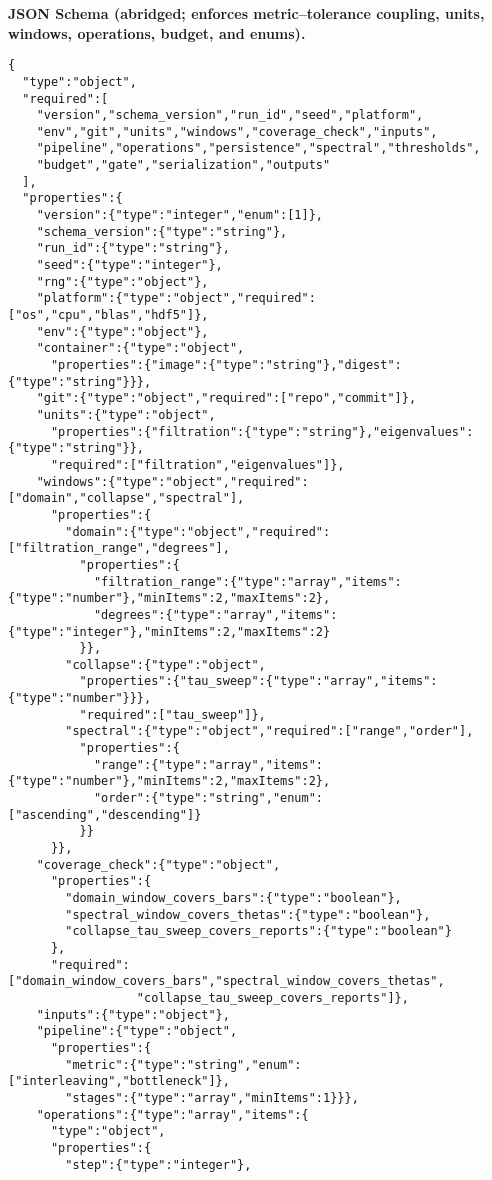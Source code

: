 \documentclass[11pt]{article}
\numberwithin{equation}{section}
\theoremstyle{definition}
\begin{document}
\noindent\textbf{JSON Schema (abridged; enforces metric–tolerance coupling, units, windows, operations, budget, and enums).}
\begin{verbatim}
{
  "type":"object",
  "required":[
    "version","schema_version","run_id","seed","platform",
    "env","git","units","windows","coverage_check","inputs",
    "pipeline","operations","persistence","spectral","thresholds",
    "budget","gate","serialization","outputs"
  ],
  "properties":{
    "version":{"type":"integer","enum":[1]},
    "schema_version":{"type":"string"},
    "run_id":{"type":"string"},
    "seed":{"type":"integer"},
    "rng":{"type":"object"},
    "platform":{"type":"object","required":["os","cpu","blas","hdf5"]},
    "env":{"type":"object"},
    "container":{"type":"object",
      "properties":{"image":{"type":"string"},"digest":{"type":"string"}}},
    "git":{"type":"object","required":["repo","commit"]},
    "units":{"type":"object",
      "properties":{"filtration":{"type":"string"},"eigenvalues":{"type":"string"}},
      "required":["filtration","eigenvalues"]},
    "windows":{"type":"object","required":["domain","collapse","spectral"],
      "properties":{
        "domain":{"type":"object","required":["filtration_range","degrees"],
          "properties":{
            "filtration_range":{"type":"array","items":{"type":"number"},"minItems":2,"maxItems":2},
            "degrees":{"type":"array","items":{"type":"integer"},"minItems":2,"maxItems":2}
          }},
        "collapse":{"type":"object",
          "properties":{"tau_sweep":{"type":"array","items":{"type":"number"}}},
          "required":["tau_sweep"]},
        "spectral":{"type":"object","required":["range","order"],
          "properties":{
            "range":{"type":"array","items":{"type":"number"},"minItems":2,"maxItems":2},
            "order":{"type":"string","enum":["ascending","descending"]}
          }}
      }},
    "coverage_check":{"type":"object",
      "properties":{
        "domain_window_covers_bars":{"type":"boolean"},
        "spectral_window_covers_thetas":{"type":"boolean"},
        "collapse_tau_sweep_covers_reports":{"type":"boolean"}
      },
      "required":["domain_window_covers_bars","spectral_window_covers_thetas",
                  "collapse_tau_sweep_covers_reports"]},
    "inputs":{"type":"object"},
    "pipeline":{"type":"object",
      "properties":{
        "metric":{"type":"string","enum":["interleaving","bottleneck"]},
        "stages":{"type":"array","minItems":1}}},
    "operations":{"type":"array","items":{
      "type":"object",
      "properties":{
        "step":{"type":"integer"},

\end{verbatim}
\end{document}
